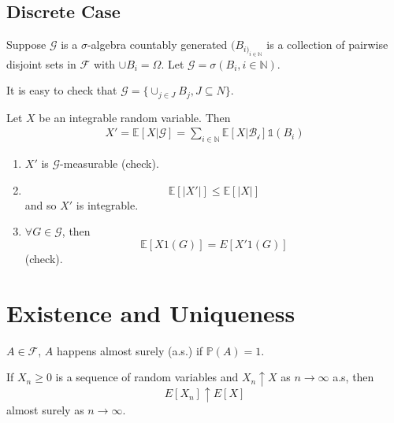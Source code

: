 \subsection{Discrete Case}
\label{sec:discrete-case}

Suppose $\mathcal{G}$ is a $\sigma$-algebra countably generated
$(B_{i)_{i \in \mathbb{N}}}$ is a collection of pairwise disjoint sets
in $\mathcal{F}$ with $\cup B_{i} = \Omega$. Let $\mathcal{G} =
\sigma(B_{i}, i \in \mathbb{N})$.

It is easy to check that $\mathcal{G} = \{ \cup_{j \in J} B_{j}, J
\subseteq {N} \}$.

Let $X$ be an integrable random variable.  Then
\begin{align*}
  X' = \mathbb{E}[X | \mathcal{G}] = \sum_{i \in \mathbb{N}}
  \mathbb{E}[X | \mathcal{B_{i}}] \mathbb{1}(B_{i})
\end{align*}

\begin{enumerate}
\item $X'$ is $\mathcal{G}$-measurable (check).
\item
  \begin{equation}
    \label{eq:3}
    \mathbb{E}[|X'|] \leq \mathbb{E}[|X|]
  \end{equation} and so $X'$ is integrable.
\item $\forall G \in \mathcal{G}$, then
  \begin{equation}
    \label{eq:4}
    \mathbb{E}[X 1(G)] = E[X' 1(G)]
  \end{equation} (check).
\end{enumerate}

\section{Existence and Uniqueness}
\label{sec:existence-uniqueness}

\begin{defn}
  \label{defn:8}
  $A \in \mathcal{F}$, $A$ happens almost surely (a.s.) if
  $\mathbb{P}(A) = 1$.
\end{defn}

\begin{thm}
  If $X_{n} \geq 0$ is a sequence of random variables and $X_{n}
  \uparrow X$ as $n \rightarrow \infty$ a.s, then
  \begin{equation}
    \label{eq:5}
    E[X_{n}] \uparrow E[X]
  \end{equation} almost surely as $n \rightarrow \infty$.
\end{thm}

